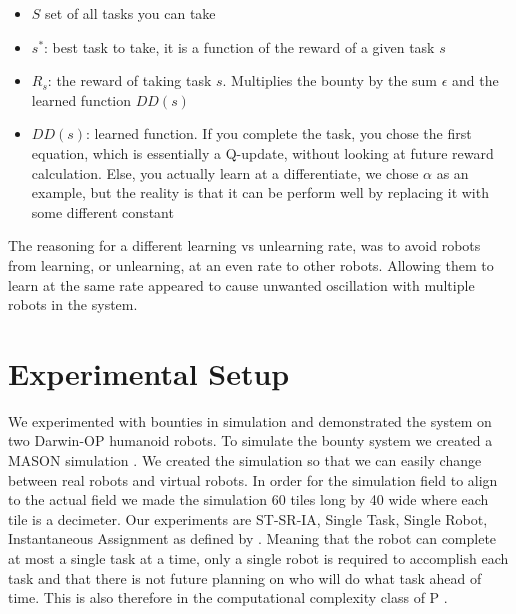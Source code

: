 \documentclass[twocolumn]{article}
\begin{document}
\begin{itemize}
\item $S$ set of all tasks you can take
\item $s^*$:  best task to take, it is a function of the reward of a given task $s$
\item $R_s$: the reward of taking task $s$. Multiplies the bounty by the sum $\epsilon$ and the learned function $DD(s)$
\item $DD(s)$:  learned function. If you complete the task, you chose the first equation, which is essentially a Q-update, without looking at future reward calculation. Else, you actually learn at a differentiate, we chose $\alpha$ as an example, but the reality is that it can be perform well by replacing it with some different constant


\end{itemize}
The reasoning for a different learning vs unlearning rate, was to avoid robots from learning, or unlearning, at an even rate to other robots. Allowing them to learn at the same rate appeared to cause unwanted oscillation with multiple robots in the system. 
\section{Experimental Setup}

We experimented with bounties in simulation and demonstrated the system on two Darwin-OP humanoid robots.  To simulate the bounty system we created a MASON simulation \cite{Luke2003}.  We created the simulation so that we can easily change between real robots and virtual robots.  In order for the simulation field to align to the actual field we made the simulation 60 tiles long by 40 wide where each tile is a decimeter.  Our experiments are ST-SR-IA, Single Task, Single Robot, Instantaneous Assignment as defined by \cite{Gerkey2004}.  Meaning that the robot can complete at most a single task at a time, only a single robot is required to accomplish each task and that there is not future planning on who will do what task ahead of time.  This is also therefore in the computational complexity class of P \cite{Campbell2010, Gerkey2003}.

\end{document}
